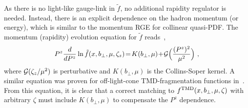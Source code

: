 \documentclass[aps,rmp,reprint,amsmath,amssymb,graphicx,longbibliography]{revtex4-1} %
\begin{document}
As there is no light-like gauge-link in $\tilde f$, no additional rapidity regulator is needed. Instead, there is an explicit dependence on the hadron momentum (or energy), which is similar to the momentum RGE for collinear quasi-PDF. The momentum (rapidity) evolution equation for $\tilde f$ reads~\cite{Collins:1981uk,Ji:2014hxa,Ji:2019ewn},
\begin{align}
	P^z\frac{d}{dP^z}\ln \tilde f(x,b_\perp,\mu,\zeta_z) \!=\! K(b_\perp,\mu)\!+\!{\cal G}\Big(\frac{(P^z)^2}{\mu^2}\Big) \ ,
\end{align}
where ${\cal G}(\zeta_z/\mu^2)$ is perturbative and $K(b_\perp,\mu)$ is the Collins-Soper kernel. A similar equation was proven for off-light-cone TMD-fragmentation functions in~\cite{Collins:1981uk}. From this equation, it is clear that a correct matching to $f^{\rm TMD}(x,b_\perp,\mu,\zeta)$ with arbitrary $\zeta$ must include $K(b_\perp,\mu)$ to compensate the $P^z$ dependence.
\end{document}
